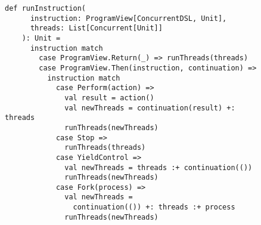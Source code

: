 \begin{figure}[htp]
  \begin{lstlisting}[language=scala3, caption={Implementazione della funzione \lstinline{runInstructions}.}, label={lst:run-instructions}]
    def runInstruction(
      instruction: ProgramView[ConcurrentDSL, Unit],
      threads: List[Concurrent[Unit]]
    ): Unit =
      instruction match
        case ProgramView.Return(_) => runThreads(threads)
        case ProgramView.Then(instruction, continuation) =>
          instruction match
            case Perform(action) =>
              val result = action()
              val newThreads = continuation(result) +: threads
              runThreads(newThreads)
            case Stop =>
              runThreads(threads)
            case YieldControl =>
              val newThreads = threads :+ continuation(())
              runThreads(newThreads)
            case Fork(process) =>
              val newThreads =
                continuation(()) +: threads :+ process
              runThreads(newThreads)
  \end{lstlisting}
\end{figure}
